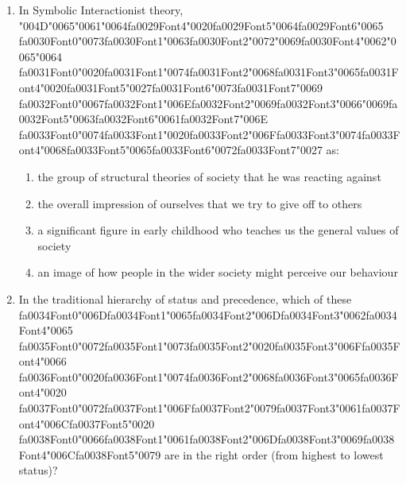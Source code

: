 \documentclass[12pt]{article}
\begin{document}
\begin{enumerate}[label=\arabic*.]
\item In Symbolic Interactionist theory, {\char"004D}{\char"0065}{\char"0061}{\char"0064}{\csname fa0029Font4\endcsname\char"0020}{\csname fa0029Font5\endcsname\char"0064}{\csname fa0029Font6\endcsname\char"0065} {\csname fa0030Font0\endcsname\char"0073}{\csname fa0030Font1\endcsname\char"0063}{\csname fa0030Font2\endcsname\char"0072}{\char"0069}{\csname fa0030Font4\endcsname\char"0062}{\char"0065}{\char"0064} {\csname fa0031Font0\endcsname\char"0020}{\csname fa0031Font1\endcsname\char"0074}{\csname fa0031Font2\endcsname\char"0068}{\csname fa0031Font3\endcsname\char"0065}{\csname fa0031Font4\endcsname\char"0020}{\csname fa0031Font5\endcsname\char"0027}{\csname fa0031Font6\endcsname\char"0073}{\csname fa0031Font7\endcsname\char"0069} {\csname fa0032Font0\endcsname\char"0067}{\csname fa0032Font1\endcsname\char"006E}{\csname fa0032Font2\endcsname\char"0069}{\csname fa0032Font3\endcsname\char"0066}{\char"0069}{\csname fa0032Font5\endcsname\char"0063}{\csname fa0032Font6\endcsname\char"0061}{\csname fa0032Font7\endcsname\char"006E} {\csname fa0033Font0\endcsname\char"0074}{\csname fa0033Font1\endcsname\char"0020}{\csname fa0033Font2\endcsname\char"006F}{\csname fa0033Font3\endcsname\char"0074}{\csname fa0033Font4\endcsname\char"0068}{\csname fa0033Font5\endcsname\char"0065}{\csname fa0033Font6\endcsname\char"0072}{\csname fa0033Font7\endcsname\char"0027} as:
\begin{enumerate}[label=(\alph*)]
    \item the group of structural theories of society that he was reacting against
    \item the overall impression of ourselves that we try to give off to others
    \item a significant figure in early childhood who teaches us the general values of society
    \item an image of how people in the wider society might perceive our behaviour
\end{enumerate}
\item In the traditional hierarchy of status and precedence, which of these {\csname fa0034Font0\endcsname\char"006D}{\csname fa0034Font1\endcsname\char"0065}{\csname fa0034Font2\endcsname\char"006D}{\csname fa0034Font3\endcsname\char"0062}{\csname fa0034Font4\endcsname\char"0065} {\csname fa0035Font0\endcsname\char"0072}{\csname fa0035Font1\endcsname\char"0073}{\csname fa0035Font2\endcsname\char"0020}{\csname fa0035Font3\endcsname\char"006F}{\csname fa0035Font4\endcsname\char"0066} {\csname fa0036Font0\endcsname\char"0020}{\csname fa0036Font1\endcsname\char"0074}{\csname fa0036Font2\endcsname\char"0068}{\csname fa0036Font3\endcsname\char"0065}{\csname fa0036Font4\endcsname\char"0020} {\csname fa0037Font0\endcsname\char"0072}{\csname fa0037Font1\endcsname\char"006F}{\csname fa0037Font2\endcsname\char"0079}{\csname fa0037Font3\endcsname\char"0061}{\csname fa0037Font4\endcsname\char"006C}{\csname fa0037Font5\endcsname\char"0020} {\csname fa0038Font0\endcsname\char"0066}{\csname fa0038Font1\endcsname\char"0061}{\csname fa0038Font2\endcsname\char"006D}{\csname fa0038Font3\endcsname\char"0069}{\csname fa0038Font4\endcsname\char"006C}{\csname fa0038Font5\endcsname\char"0079} are in the right order (from highest to lowest status)?

\end{enumerate}
\end{document}
